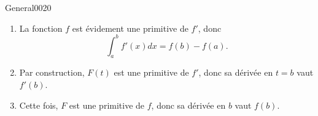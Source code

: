\begin{corrige}{General0020}

\begin{enumerate}

\item
La fonction $f$ est évidement une primitive de $f'$, donc
\begin{equation}
	\int_a^bf'(x)dx=f(b)-f(a).
\end{equation}

\item
Par construction, $F(t)$ est une primitive de $f'$, donc sa dérivée en $t=b$ vaut $f'(b)$.

\item
Cette fois, $F$ est une primitive de $f$, donc sa dérivée en $b$ vaut $f(b)$.

\end{enumerate}

\end{corrige}
